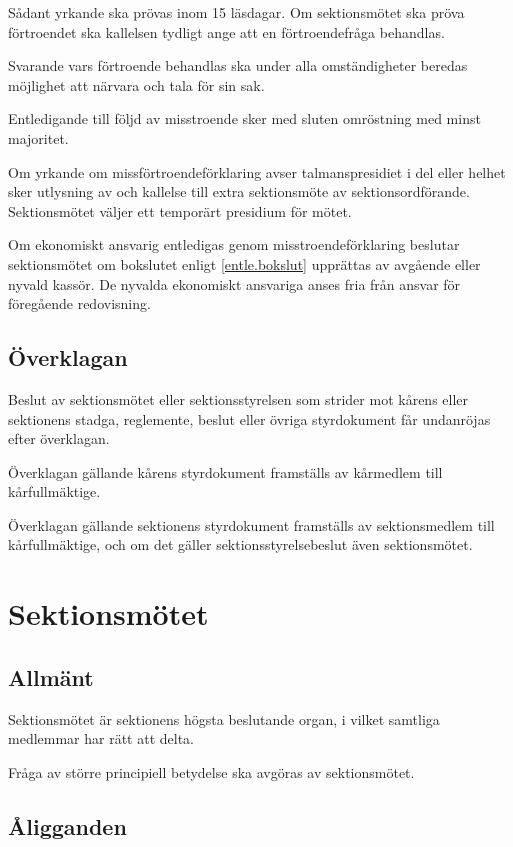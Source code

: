 \documentclass{styrdokument}
\begin{document}
\? Sådant yrkande ska prövas inom 15 läsdagar.
Om sektionsmötet ska pröva förtroendet ska kallelsen tydligt ange att en förtroendefråga behandlas.
\label{beslut.misstroende.kallelse}

\? Svarande vars förtroende behandlas ska under alla omständigheter beredas möjlighet att närvara och tala för sin sak.

\? Entledigande till följd av misstroende sker med sluten omröstning med minst  majoritet.
\label{beslut.misstroende.majoritet}

\? Om yrkande om missförtroendeförklaring avser talmanspresidiet i del eller helhet sker utlysning av och kallelse till extra sektionsmöte av sektionsordförande.
Sektionsmötet väljer ett temporärt presidium för mötet.

\? Om ekonomiskt ansvarig entledigas genom misstroendeförklaring beslutar sektionsmötet om bokslutet enligt \cref{entle.bokslut} upprättas av avgående eller nyvald kassör.
De nyvalda ekonomiskt ansvariga anses fria från ansvar för föregående redovisning.

\subsection{Överklagan}

\? Beslut av sektionsmötet eller sektionsstyrelsen som strider mot kårens eller sektionens stadga, reglemente, beslut eller övriga styrdokument får undanröjas efter överklagan.

\? Överklagan gällande kårens styrdokument framställs av kårmedlem till kårfullmäktige.

\? Överklagan gällande sektionens styrdokument framställs av sektionsmedlem till kårfullmäktige, och om det gäller sektionsstyrelsebeslut även sektionsmötet.

\section{Sektionsmötet}
\subsection{Allmänt}

\? Sektionsmötet är sektionens högsta beslutande organ, i vilket samtliga medlemmar har rätt att delta.

\? Fråga av större principiell betydelse ska avgöras av sektionsmötet.

\subsection{Åligganden}
\end{document}
